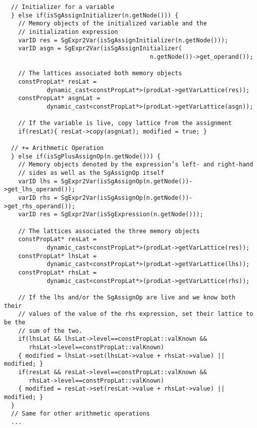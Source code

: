 {\begin{frame}
\begin{lstlisting}
  // Initializer for a variable
  } else if(isSgAssignInitializer(n.getNode())) {
    // Memory objects of the initialized variable and the 
    // initialization expression
    varID res = SgExpr2Var(isSgAssignInitializer(n.getNode()));
    varID asgn = SgExpr2Var(isSgAssignInitializer(
                                         n.getNode())->get_operand());

    // The lattices associated both memory objects
    constPropLat* resLat = 
            dynamic_cast<constPropLat*>(prodLat->getVarLattice(res));
    constPropLat* asgnLat = 
            dynamic_cast<constPropLat*>(prodLat->getVarLattice(asgn));

    // If the variable is live, copy lattice from the assignment
    if(resLat){ resLat->copy(asgnLat); modified = true; }

  // += Arithmetic Operation
  } else if(isSgPlusAssignOp(n.getNode())) {
    // Memory objects denoted by the expression’s left- and right-hand   
    // sides as well as the SgAssignOp itself
    varID lhs = SgExpr2Var(isSgAssignOp(n.getNode())->get_lhs_operand());
    varID rhs = SgExpr2Var(isSgAssignOp(n.getNode())->get_rhs_operand());
    varID res = SgExpr2Var(isSgExpression(n.getNode()));

    // The lattices associated the three memory objects
    constPropLat* resLat = 
            dynamic_cast<constPropLat*>(prodLat->getVarLattice(res));
    constPropLat* lhsLat = 
            dynamic_cast<constPropLat*>(prodLat->getVarLattice(lhs));
    constPropLat* rhsLat = 
            dynamic_cast<constPropLat*>(prodLat->getVarLattice(rhs));

    // If the lhs and/or the SgAssignOp are live and we know both their 
    // values of the value of the rhs expression, set their lattice to be the     
    // sum of the two.
    if(lhsLat && lhsLat->level==constPropLat::valKnown && 
       rhsLat->level==constPropLat::valKnown)
    { modified = lhsLat->set(lhsLat->value + rhsLat->value) || modified; }
    if(resLat && resLat->level==constPropLat::valKnown && 
       rhsLat->level==constPropLat::valKnown)
    { modified = resLat->set(resLat->value + rhsLat->value) || modified; }
  } 
  // Same for other arithmetic operations
  ...


\end{lstlisting}
\end{frame}}
